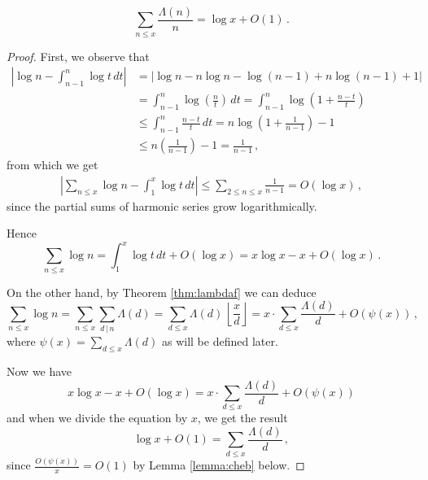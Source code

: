 \documentclass{article}
\begin{document}
\begin{lemma}
\label{lemma:lambdadd}
\begin{equation*}
    \sum_{n\leq x} \frac{\Lambda(n)}{n} = \log x + O(1)\,.
\end{equation*}
\begin{proof}
First, we observe that
\begin{align*}
    \left\vert \log n - \int_{n-1}^n \log t \,dt \right\vert & = \vert \log n - n\log n -\log (n-1) + n\log (n-1) +1 \vert \\
    & = \int_{n-1}^n \log \left(\frac{n}{t}\right) \,dt = \int_{n-1}^n \log \left(1+\frac{n-t}{t}\right)\\
    & \leq \int_{n-1}^n \frac{n-t}{t} \,dt = n\log \left(1+\frac{1}{n-1}\right) - 1\\
    & \leq n\left(\frac{1}{n-1}\right) - 1 = \frac{1}{n-1}\,,
\end{align*}
from which we get
\begin{align*}
    \left\vert \sum_{n\leq x} \log n - \int_1^x \log t \,dt \right\vert \leq \sum_{2\leq n\leq x} \frac{1}{n-1} = O(\log x)\,,
\end{align*}
 since the partial sums of harmonic series grow logarithmically.
 
Hence
 \begin{equation*}
     \sum_{n\leq x} \log n = \int_1^x \log t\,dt + O(\log x) = x\log x - x + O(\log x)\,.
 \end{equation*}

On the other hand, by Theorem \ref{thm:lambdaf} we can deduce
\begin{equation*}
    \sum_{n\leq x} \log n = \sum_{n\leq x} \sum_{d\,\vert\, n} \Lambda(d) = \sum_{d\leq x} \Lambda(d)\,\left\lfloor \frac{x}{d}\right\rfloor = x\cdot\sum_{d\leq x} \frac{\Lambda(d)}{d} + O(\psi(x))\,,
\end{equation*}
where $\psi(x)=\sum_{d\leq x} \Lambda(d)$ as will be defined later.

Now we have
\begin{equation*}
    x\log x - x + O(\log x) = x\cdot\sum_{d\leq x} \frac{\Lambda(d)}{d} + O(\psi(x))
\end{equation*}
and when we divide the equation by $x$, we get the result
\begin{equation*}
    \log x + O(1) = \sum_{d\leq x} \frac{\Lambda(d)}{d}\,,
\end{equation*}
since $\frac{O(\psi(x))}{x}=O(1)$ by Lemma \ref{lemma:cheb} below.
\end{proof}
\end{lemma}
\end{document}
